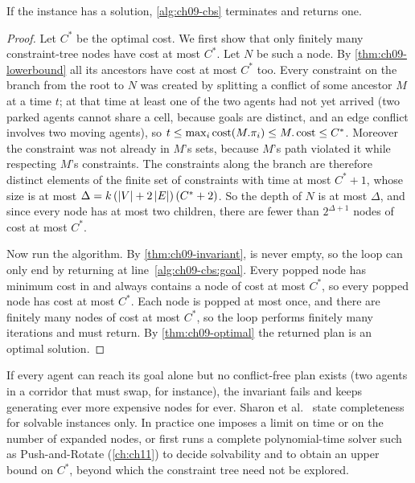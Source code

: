 \begin{theorem}
\label{thm:ch09-complete}
If the instance has a solution, \cref{alg:ch09-cbs} terminates and returns
one.
\end{theorem}
\begin{proof}
Let $C^*$ be the optimal cost. We first show that only finitely many
constraint-tree nodes have cost at most $C^*$. Let $N$ be such a node. By
\cref{thm:ch09-lowerbound} all its ancestors have cost at most $C^*$ too.
Every constraint on the branch from the root to $N$ was created by splitting
a conflict of some ancestor $M$ at a time $t$; at that time at least one of
the two agents had not yet arrived (two parked agents cannot share a cell,
because goals are distinct, and an edge conflict involves two moving
agents), so $t \le \max_i \operatorname{cost}(M.\pi_i) \le M.\operatorname{cost} \le C^*$. Moreover the
constraint was not already in $M$'s sets, because $M$'s path violated it
while respecting $M$'s constraints. The constraints along the branch are
therefore distinct elements of the finite set of constraints with time at
most $C^* + 1$, whose size is at most $\Delta = k\,(\left\lvert V \right\rvert + 2\left\lvert E \right\rvert)\,(C^* + 2)$.
So the depth of $N$ is at most $\Delta$, and since every node has at most
two children, there are fewer than $2^{\Delta + 1}$ nodes of cost at most
$C^*$.

Now run the algorithm. By \cref{thm:ch09-invariant}, \Open is never empty,
so the loop can only end by returning at line~\ref{alg:ch09-cbs:goal}.
Every popped node has minimum cost in \Open and \Open always contains a
node of cost at most $C^*$, so every popped node has cost at most $C^*$.
Each node is popped at most once, and there are finitely many nodes of cost
at most $C^*$, so the loop performs finitely many iterations and must
return. By \cref{thm:ch09-optimal} the returned plan is an optimal solution.
\qedhere
\end{proof}

\begin{remark}
\label{rem:ch09-unsolvable}
If every agent can reach its goal alone but no conflict-free plan exists
(two agents in a corridor that must swap, for instance), the invariant
fails and \cbs keeps generating ever more expensive nodes for ever. Sharon
et al.~\cite{sharon2015cbs} state completeness for solvable instances only.
In practice one imposes a limit on time or on the number of expanded nodes,
or first runs a complete polynomial-time solver such as Push-and-Rotate
(\cref{ch:ch11}) to decide solvability and to obtain an upper bound on
$C^*$, beyond which the constraint tree need not be explored.
\end{remark}

